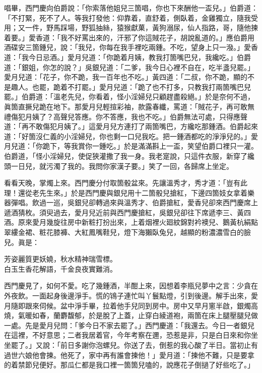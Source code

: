唱畢，西門慶向伯爵說：「你索落他姐兒三箇唱，你也下來酬他一盃兒。」伯爵道：「不打緊，死不了人。等我打發他：仰靠着，直舒着，側臥着，金雞獨立，隨我受用；又一件，野馬踩場，野狐抽絲，猿猴獻菓，黃狗溺尿，仙人指路，哥，隨他揀着要。」{}愛香道：「我不好罵出來的，汗邪了你這賊花子，胡說亂道的。」應伯爵用酒碟安三箇鍾兒，說：「我兒，你每在我手裡吃兩鍾。不吃，望身上只一潑。」愛香道：「我今日忌酒。」愛月兒道：「你跪着月姨，教我打箇嘴巴兒，我纔吃。」伯爵道：「銀姐，你怎的說？」吳銀兒道：「二爹，我今日心裡不自在，吃半盞兒罷。」愛月兒道：「花子，你不跪，我一百年也不吃。」黃四道：「二叔，你不跪，顯的不是趣人。也罷，跪着不打罷。」愛月兒道：「跪了也不打多，只教我打兩箇嘴巴兒罷。」伯爵道：「溫老先兒，你看着，怪小淫婦兒只顧趕盡殺絕。」於是奈何不過，眞箇直撅兒跪在地下。那愛月兒輕揎彩袖，款露春纖，罵道：「賊花子，再可敢無禮傷犯月姨了？高聲兒答應。你不答應，我也不吃。」伯爵無法可處，只得應聲道：「再不敢傷犯月姨了。」這愛月兒方連打了兩箇嘴巴，方纔吃那鍾酒。{}伯爵起來道：「好箇沒仁義的小淫婦兒，你也剩一口兒我吃。把一鍾酒都吃的淨淨兒的。」愛月兒道：「你跪下，等我賞你一鍾吃。」於是滿滿斟上一盃，笑望伯爵口裡只一灌。伯爵道，「怪小淫婦兒，使促狹灌撒了我一身。我老寔說，只這件衣服，新穿了纔頭一日兒，就污濁了我的。我問你家漢子要。」{}笑了一回，各歸席上坐定。

看看天晚，掌燭上來。西門慶分付取箇骰盆來。先讓溫秀才，秀才道：「豈有此理！還從老先生來。」於是西門慶與銀兒用十二箇骰兒搶紅，下邊四箇妓女拿着樂器彈唱。飲過一巡，吳銀兒卻轉過來與溫秀才、伯爵搶紅，愛香兒卻來西門慶席上遞酒猜枚。須臾過去，愛月兒近前與西門慶搶紅，吳銀兒卻往下席遞李三、黃四酒。原來愛月幾旋往房中新粧打扮出來，上着烟裡火廻紋錦對衿襖兒、鵝黃杭絹點翠縷金裙、粧花膝褲、大紅鳳嘴鞋兒，燈下海獺臥兔兒，越顯的粉濃濃雪白的臉兒。眞是：

\begin{myquote} 
芳姿麗質更妖嬈，秋水精神瑞雪標。\\白玉生香花解語，千金良夜實難消。
\end{myquote} 

西門慶見了，如何不愛。吃了幾鍾酒，半酣上來，因想着李瓶兒夢中之言：少貪在外夜飲。一面起身後邊淨手。慌的鴇子連忙叫丫鬟點燈，引到後邊。解手出來，愛月隨即跟來伺候。盆中淨手畢，拉着他手兒同到房中。房中又早月窻半啟，銀燭高燒，氣暖如春，蘭麝馥郁，於是脫了上蓋，止穿白綾道袍，兩箇在床上腿壓腿兒做一處。先是愛月兒問：「爹今日不家去罷了。」西門慶道：「我還去。今日一者銀兒在這裡，不好意思；二者我居着官，今年考察在邇，恐惹是非，只是白日來和你坐坐罷了。」又說：「前日多謝你泡螺兒。你送了去，倒惹的我心酸了半日。當初止有過世六娘他會揀。他死了，家中再有誰會揀他！」{}愛月道：「揀他不難，只是要拿的着禁節兒便好。那瓜仁都是我口裡一箇箇兒嗑的，說應花子倒撾了好些吃了。」

